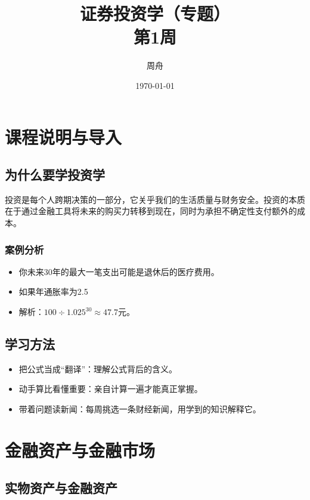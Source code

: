 \documentclass[11pt]{ctexart}
\title{证券投资学（专题）\\第1周}
\author{周舟}
\date{\today}
\theoremstyle{definition}
\begin{document}
\maketitle

\chapter*{课程说明与导入}

\section*{为什么要学投资学}

投资是每个人跨期决策的一部分，它关乎我们的生活质量与财务安全。投资的本质在于通过金融工具将未来的购买力转移到现在，同时为承担不确定性支付额外的成本。

\subsection*{案例分析}

\begin{itemize}
    \item 你未来30年的最大一笔支出可能是退休后的医疗费用。
    \item 如果年通胀率为2.5%
    \item 解析：$100 \div 1.025^{30} \approx 47.7$元。
\end{itemize}

\section*{学习方法}

\begin{itemize}
    \item 把公式当成“翻译”：理解公式背后的含义。
    \item 动手算比看懂重要：亲自计算一遍才能真正掌握。
    \item 带着问题读新闻：每周挑选一条财经新闻，用学到的知识解释它。
\end{itemize}

\chapter*{金融资产与金融市场}

\section*{实物资产与金融资产}
\end{document}
